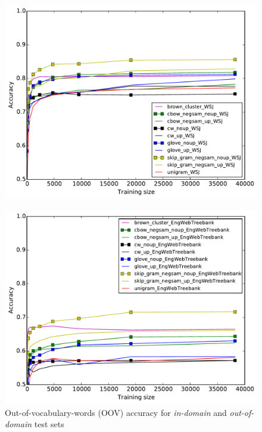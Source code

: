 \fi


\iffalse
\begin{figure}
\caption{Out-of-vocabulary-words (OOV) accuracy for \textit{in-domain} and \textit{out-of-domain} test sets}
\label{OOV} 
  \begin{minipage}[b]{7cm}
    	\includegraphics[scale=0.4]{plots/POS-OOV-IN}
    \label{POS-OOV-IN}	
  \end{minipage} 
  \begin{minipage}[b]{7cm}
    	\includegraphics[scale=0.4]{plots/POS-OOV-OUT}

\end{minipage}
\end{figure}
